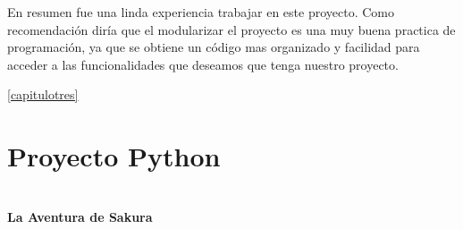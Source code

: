 \documentclass[12pt]{report}
\begin{document}
En resumen fue una linda experiencia trabajar en este proyecto.
\newline
\newline
Como recomendación diría que el modularizar el proyecto es una muy buena practica de programación, ya que se obtiene un código mas organizado y facilidad para acceder a las funcionalidades que deseamos que tenga nuestro proyecto.
\newline\newline
\newline\newline
\newline\newline
\newline\newline
\newline\newline
\newline\newline
\newline\newline
\newline\newline
\newline\newline
\newline\newline
\newline\newline
\newline\newline
\newline\newline
\newline\newline
\newline



 \ref{capitulotres}




\newpage
\chapter{Proyecto Python\label{capitulocuatro}}
\begin{center}
		\Huge{\textbf{\\La Aventura de Sakura	\vspace{1em}}}
\end{center}	
\end{document}
